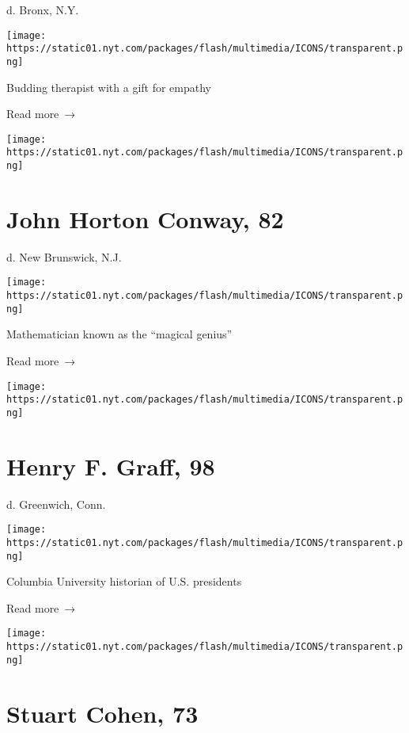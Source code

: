 d. Bronx, N.Y.

\texttt{[image: https://static01.nyt.com/packages/flash/multimedia/ICONS/transparent.png]}

Budding therapist with a gift for empathy

 Read more~→

\href{https://www.nytimes.com/2020/04/15/technology/john-horton-conway-dead-coronavirus.html}{}

\texttt{[image: https://static01.nyt.com/packages/flash/multimedia/ICONS/transparent.png]}

\hypertarget{john-horton-conway-82}{%
\section{John Horton Conway, 82}\label{john-horton-conway-82}}

d. New Brunswick, N.J.

\texttt{[image: https://static01.nyt.com/packages/flash/multimedia/ICONS/transparent.png]}

Mathematician known as the ``magical genius''

 Read more~→

\href{https://www.nytimes.com/2020/04/15/books/henry-f-graff-columbia-historian-of-presidents-dies-at-98.html}{}

\texttt{[image: https://static01.nyt.com/packages/flash/multimedia/ICONS/transparent.png]}

\hypertarget{henry-f-graff-98}{%
\section{Henry F. Graff, 98}\label{henry-f-graff-98}}

d. Greenwich, Conn.

\texttt{[image: https://static01.nyt.com/packages/flash/multimedia/ICONS/transparent.png]}

Columbia University historian of U.S. presidents

 Read more~→

\href{https://www.nytimes.com/2020/04/15/nyregion/stuart-cohen-dead-coronavirus.html}{}

\texttt{[image: https://static01.nyt.com/packages/flash/multimedia/ICONS/transparent.png]}

\hypertarget{stuart-cohen-73}{%
\section{Stuart Cohen, 73}\label{stuart-cohen-73}}

